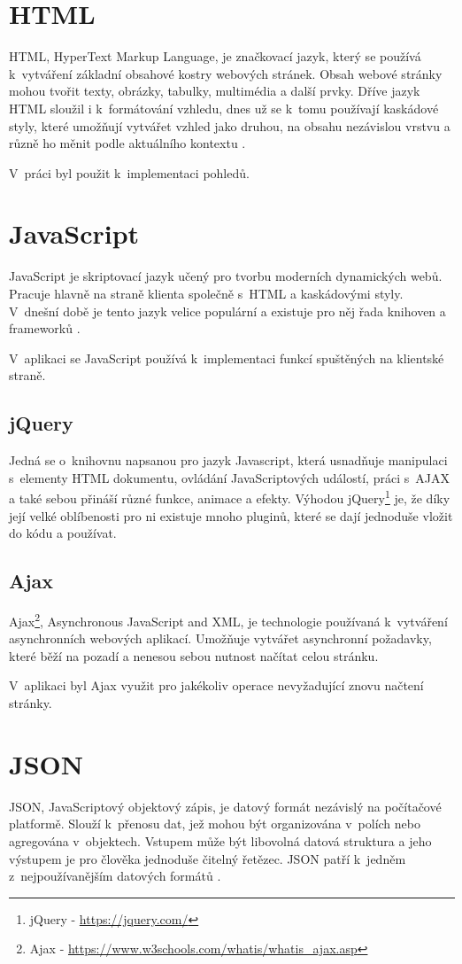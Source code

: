 \section{HTML}
HTML, HyperText Markup Language, je značkovací jazyk, který se používá k~vytváření základní obsahové kostry webových stránek. Obsah webové stránky mohou tvořit texty, obrázky, tabulky, multimédia a další prvky. Dříve jazyk HTML sloužil i k~formátování vzhledu, dnes už se k~tomu používají kaskádové styly, které umožňují vytvářet vzhled jako druhou, na obsahu nezávislou vrstvu a různě ho měnit podle aktuálního kontextu \cite{html}.

V~práci byl použit k~implementaci pohledů.

\section{JavaScript}
JavaScript je skriptovací jazyk učený pro tvorbu moderních dynamických webů. Pracuje hlavně na straně klienta společně s~HTML a kaskádovými styly. V~dnešní době je tento jazyk velice populární a existuje pro něj řada knihoven a frameworků \cite{javascript}.

V~aplikaci se JavaScript používá k~implementaci funkcí spuštěných na klientské straně.

\subsection{jQuery}
Jedná se o~knihovnu napsanou pro jazyk Javascript, která usnadňuje manipulaci s~elementy HTML dokumentu, ovládání JavaScriptových událostí, práci s~AJAX a také sebou přináší různé funkce, animace a efekty. Výhodou jQuery\footnote{jQuery - \url{https://jquery.com/}} je, že díky její velké oblíbenosti pro ni existuje mnoho pluginů, které se dají jednoduše vložit do kódu a používat.

\subsection{Ajax}
Ajax\footnote{Ajax - \url{https://www.w3schools.com/whatis/whatis_ajax.asp}}, Asynchronous JavaScript and XML, je technologie používaná k~vytváření asynchronních webových aplikací. Umožňuje vytvářet asynchronní požadavky, které běží na pozadí a nenesou sebou nutnost načítat celou stránku.

V~aplikaci byl Ajax využit pro jakékoliv operace nevyžadující znovu načtení stránky. 

\section{JSON}
JSON, JavaScriptový objektový zápis, je datový formát nezávislý na počítačové platformě. Slouží k~přenosu dat, jež mohou být organizována v~polích nebo agregována v~objektech. Vstupem může být libovolná datová struktura a jeho výstupem je pro člověka jednoduše čitelný řetězec. JSON patří k~jedněm z~nejpoužívanějším datových formátů \cite{json}. 

